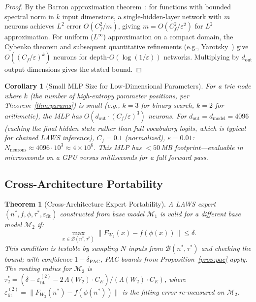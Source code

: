 \documentclass[11pt]{article}
\newtheorem{theorem}{Theorem}
\newtheorem{corollary}{Corollary}
\begin{document}
\begin{proof}
By the Barron approximation theorem~\cite{barron1993}: for functions with
bounded spectral norm in $k$ input dimensions, a single-hidden-layer network
with $m$ neurons achieves $L^2$ error $O(C_f^2/m)$, giving $m = O(C_f^2/\varepsilon^2)$
for $L^2$ approximation.  For uniform ($L^\infty$) approximation on a compact
domain, the Cybenko theorem and subsequent quantitative refinements
(e.g., Yarotsky~\cite{yarotsky2017}) give $O((C_f/\varepsilon)^k)$ neurons for
depth-$O(\log(1/\varepsilon))$ networks.  Multiplying by $d_{\mathrm{out}}$ output dimensions
gives the stated bound.
\end{proof}

\begin{corollary}[Small MLP Size for Low-Dimensional Parameters]
For a trie node where $k$ (the number of high-entropy parameter positions,
per Theorem~\ref{thm:params}) is small (e.g., $k=3$ for binary search,
$k=2$ for arithmetic), the MLP has $O(d_{\mathrm{out}} \cdot (C_f/\varepsilon)^3)$ neurons.
For $d_{\mathrm{out}} = d_{\mathrm{model}} = 4096$ (caching the final hidden state
rather than full vocabulary logits, which is typical for chained LAWS inference),
$C_f = 0.1$ (normalized), $\varepsilon = 0.01$:
$N_{\mathrm{neurons}} \approx 4096 \cdot 10^3 \approx 4 \times 10^6$.
This MLP has $< 50$\,MB footprint---evaluable in microseconds on a GPU versus
milliseconds for a full forward pass.
\end{corollary}

\subsection{Cross-Architecture Portability}

\begin{theorem}[Cross-Architecture Expert Portability]
\label{thm:portable}
A LAWS expert $(n^*, f, \phi, \tau^*, \varepsilon_{\mathrm{fit}})$ constructed
from base model $\mathcal{M}_1$ is valid for a different base model $\mathcal{M}_2$
if:
\[
  \max_{x \in \mathcal{B}(n^*, \tau^*)} \|F_{W_2}(x) - f(\phi(x))\|
  \leq \delta.
\]
This condition is testable by sampling $N$ inputs from $\mathcal{B}(n^*, \tau^*)$
and checking the bound; with confidence $1 - \delta_{\mathrm{PAC}}$, PAC
bounds from Proposition~\ref{prop:pac} apply.  The routing radius for
$\mathcal{M}_2$ is $\tau^*_2 = (\delta - \varepsilon^{(2)}_{\mathrm{fit}} -
2\,\Lambda(W_2) \cdot C_E) / (\Lambda(W_2) \cdot C_E)$, where $\varepsilon^{(2)}_{\mathrm{fit}} = \|F_{W_2}(n^*) - f(\phi(n^*))\|$ is the fitting error re-measured on $\mathcal{M}_2$.
\end{theorem}
\end{document}

